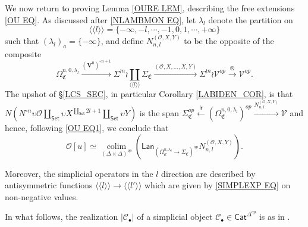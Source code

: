 \documentclass[a4paper,10pt
,draft
]{article}%
\numberwithin{equation}{section}
\numberwithin{figure}{section}
\theoremstyle{definition} %
\DeclareMathOperator{\colim}{colim}%
\newcommand{\V}{\ensuremath{\mathcal V}}
\renewcommand{\O}{\ensuremath{\mathcal O}}
\newcommand{\1}{\ensuremath{\mathbbm 1}}%
\begin{document}
We now return to proving Lemma \ref{OURE LEM},
describing the free extensions \eqref{OU EQ}.
As discussed after \eqref{NLAMBMON EQ},
let $\lambda_l$ denote the partition on 
\[
\langle \langle l \rangle \rangle
=
\{-\infty,-l,\cdots,-1,0,1,\cdots,+\infty\}
\]
such that $\left(\lambda_l\right)_a = \{-\infty\}$,
and define $N_{n,l}^{(\O,X,Y)}$ to be the opposite of the composite
\[
\Omega_{\mathfrak C}^{n,0,\lambda_l} \xrightarrow{(\boldsymbol{V}^0)^{\circ n+1}}
\Sigma^{\wr n} \wr \coprod_{\langle \langle l \rangle \rangle} \Sigma_{\mathfrak C} \xrightarrow{(\O,X,\dots,X,Y)}
\Sigma^{\wr n} \wr \V^{op} \xrightarrow{\otimes}
\V^{op}.
\]
The upshot of \S \ref{LCS_SEC}, in particular Corollary \ref{LABIDEN_COR}, is that
$\mbox{$N \left(N^{\circ n} \upsilon \O \amalg_{\mathsf{Set}} \upsilon X^{\amalg_{\mathsf{Set}} 2l +1}\amalg_{\mathsf{Set}} \upsilon Y \right)$}$
is the span
$\mbox{$\Sigma_{\mathfrak C}^{op} \xleftarrow{\mathsf{lr}} (\Omega_{\mathfrak C}^{n,0,\lambda_l})^{op} \xrightarrow{N_{n,l}^{(\O,X,Y)}} \V$}$
and hence, following \eqref{OU EQ1}, we conclude that
\begin{equation}\label{1STRED EQ}
\O[u] \simeq
\mathop{\colim}\limits_{(\Delta \times \Delta)^{op}}
\left(
\mathsf{Lan}_{\left(\Omega_{\mathfrak C}^{n,\lambda_l} \to \Sigma_{\mathfrak C}\right)^{op}} N_{n,l}^{(\O,X,Y)}
\right).
\end{equation}


Moreover, the simplicial operators in the $l$ direction are described by antisymmetric functions $\langle \langle l \rangle \rangle
\to \langle \langle l' \rangle \rangle
$
which are given by \eqref{SIMPLEXP EQ} on non-negative values.

In what follows,
the realization $|\mathcal{C}_{\bullet}|$
of a simplicial object
$\mathcal{C}_{\bullet} \in \mathsf{Cat}^{\Delta^{op}}$
is as in \cite[(A.1)]{BP_geo}.
\end{document}
